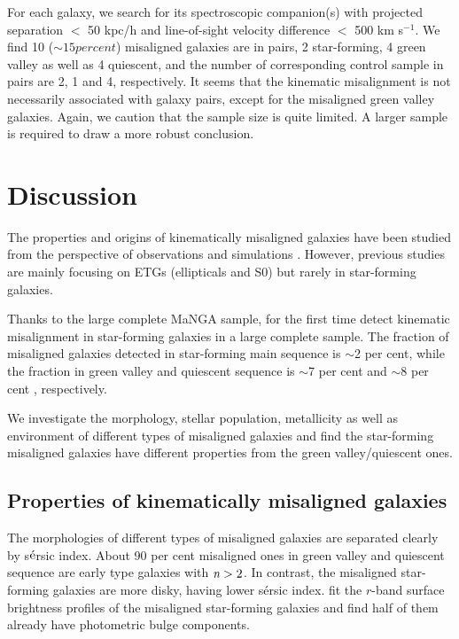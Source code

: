 \documentclass[a4paper,fleqn,usenatbib]{mnras}
\begin{document}
For each galaxy, we search for its spectroscopic companion(s) with projected separation $<$ 50 kpc/h and line-of-sight velocity difference $<$ 500 km s$^{-1}$. 
We find 10 ($\sim15 per cent$) misaligned galaxies are in pairs, 2 star-forming, 4 green valley as well as 4 quiescent, and the number of corresponding control sample in pairs are 2, 1 and 4, respectively. 
It seems that the kinematic misalignment is not necessarily associated with galaxy pairs, except for the misaligned green valley galaxies.
Again, we caution that the sample size is quite limited. A larger sample is required to draw a more robust conclusion.

\section{Discussion}\label{sec:discussion}


The properties and origins of kinematically misaligned galaxies have been studied from the 
perspective of observations \citep{kannappan-2001, Sarzi06, davis-2011} and simulations \citep{voort-2015, lagos-2015}. 
However, previous studies are mainly focusing on ETGs (ellipticals and S0) but rarely in star-forming galaxies. 

Thanks to the large complete MaNGA sample, \cite{chen-prep} for the first time detect kinematic misalignment in star-forming galaxies 
in a large complete sample. 
The fraction of misaligned galaxies detected in star-forming main sequence is $\sim$2 per cent, while the fraction in green valley and quiescent sequence is $\sim$7 per cent and $\sim$8 per cent , respectively.

We investigate the morphology, stellar population, metallicity as well as environment of different types of misaligned galaxies 
and find the star-forming misaligned galaxies have different properties from the green valley/quiescent ones.

\subsection{Properties of kinematically misaligned galaxies}

 
The morphologies of different types of misaligned galaxies are separated clearly by s$\acute{\rm e}$rsic index. 
About 90 per cent misaligned ones in green valley and quiescent sequence are early type galaxies with $\emph{n}>2$. 
In contrast, the misaligned star-forming galaxies are more disky, having lower s{\'e}rsic index. 
\cite{chen-prep} fit the $r$-band surface brightness profiles of the misaligned star-forming galaxies and find half of them 
already have photometric bulge components. 
\end{document}
